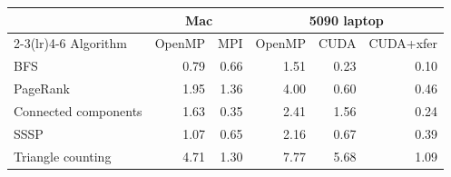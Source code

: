 \begin{tabular}{@{}lrrrrr@{}}
\toprule
 & \multicolumn{2}{c}{Mac} & \multicolumn{3}{c}{5090 laptop} \\
\cmidrule(lr){2-3}\cmidrule(lr){4-6}
Algorithm & OpenMP & MPI & OpenMP & CUDA & CUDA+xfer \\
\midrule
BFS & 0.79 & 0.66 & 1.51 & 0.23 & 0.10 \\
PageRank & 1.95 & 1.36 & 4.00 & 0.60 & 0.46 \\
Connected components & 1.63 & 0.35 & 2.41 & 1.56 & 0.24 \\
SSSP & 1.07 & 0.65 & 2.16 & 0.67 & 0.39 \\
Triangle counting & 4.71 & 1.30 & 7.77 & 5.68 & 1.09 \\
\bottomrule
\end{tabular}
